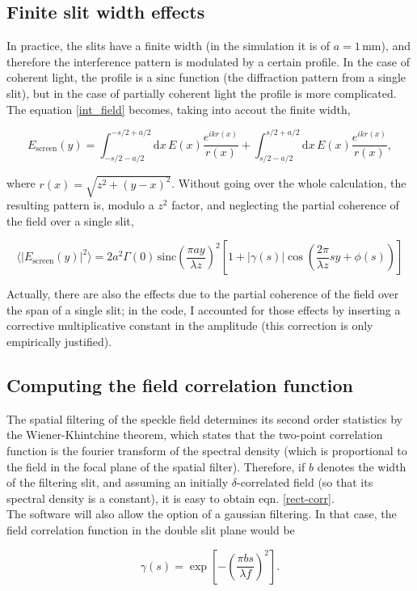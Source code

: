 \subsection{Finite slit width effects}

In practice, the slits have a finite width (in the simulation it is of $a = 1 \, \mathrm{mm}$), and therefore the interference pattern is modulated by a certain 
profile. In the case of coherent light, the profile is a $\mathrm{sinc}$ function (the diffraction pattern from a single slit), but in the case of partially 
coherent light the profile is more complicated. The equation \eqref{int_field} becomes, taking into accout the finite width,

\begin{equation}
    E_{\text{screen}}(y) = \int_{-s/2-a/2}^{-s/2 + a/2} \mathrm dx \, E(x)\frac{e^{ikr(x)}}{r(x)} + \int_{s/2-a/2}^{s/2 + a/2} \mathrm dx \, E(x)\frac{e^{ikr(x)}}{r(x)},
\end{equation}

where $r(x) = \sqrt{z^2 + (y - x)^2}$. Without going over the whole calculation, the resulting pattern is, modulo a $z^2$ factor, and 
neglecting the partial coherence of the field over a single slit,

\begin{equation} \label{theopatt}
    \langle |E_{\text{screen}}(y)|^2 \rangle = 2a^2 \Gamma(0) \, \mathrm{sinc}  \left( \frac{\pi a y}{\lambda z} \right)^2 \left[ 1 + |\gamma(s)| \cos\left( \frac{2\pi}{\lambda z}sy +\phi(s) \right) \right]
\end{equation}

Actually, there are also the effects due to the partial coherence of the field over the span of a single slit; in the code, I accounted for those effects by 
inserting a corrective multiplicative constant in the amplitude (this correction is only empirically justified).

\subsection{Computing the field correlation function} \label{comp_corr}

The spatial filtering of the speckle field determines its second order statistics by the Wiener-Khintchine theorem, which states that the two-point correlation 
function is the fourier transform of the spectral density (which is proportional to the field in the focal plane of the spatial filter). Therefore, if $b$ denotes 
the width of the filtering slit, and assuming an initially $\delta$-correlated field (so that its spectral density is a constant), it is easy to obtain eqn. 
\eqref{rect-corr}. \\

The software will also allow the option of a gaussian filtering. In that case, the field correlation function in the double slit plane would be 

\begin{equation}
    \gamma(s) = \exp\left[-\left(\frac{\pi bs}{\lambda f}\right)^2\right].
\end{equation}

